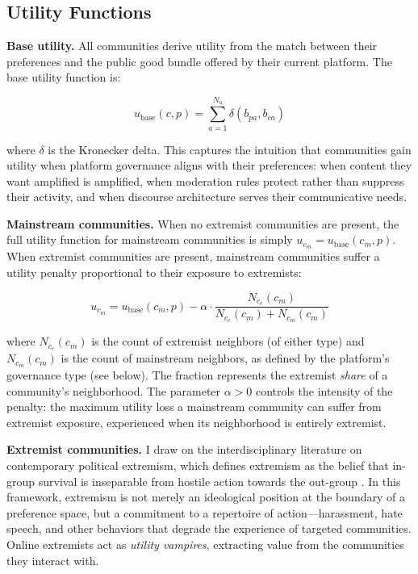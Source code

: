 \documentclass{article}
\begin{document}
\subsection{Utility Functions}
\label{sec:utility}

\textbf{Base utility.} All communities derive utility from the match between their preferences and the public good bundle offered by their current platform. The base utility function is:

\begin{equation}
u_{\text{base}}(c, p) = \sum_{a=1}^{N_a} \delta(b_{pa}, b_{ca})
\label{eq:base}
\end{equation}

\noindent where $\delta$ is the Kronecker delta. This captures the intuition that communities gain utility when platform governance aligns with their preferences: when content they want amplified is amplified, when moderation rules protect rather than suppress their activity, and when discourse architecture serves their communicative needs.

\textbf{Mainstream communities.} When no extremist communities are present, the full utility function for mainstream communities is simply $u_{c_m} = u_{\text{base}}(c_m, p)$. When extremist communities are present, mainstream communities suffer a utility penalty proportional to their exposure to extremists:

\begin{equation}
u_{c_m} = u_{\text{base}}(c_m, p) - \alpha \cdot \frac{N_{c_e}(c_m)}{N_{c_e}(c_m) + N_{c_m}(c_m)}
\label{eq:mainstream_app}
\end{equation}

\noindent where $N_{c_e}(c_m)$ is the count of extremist neighbors (of either type) and $N_{c_m}(c_m)$ is the count of mainstream neighbors, as defined by the platform's governance type (see below). The fraction represents the extremist \textit{share} of a community's neighborhood. The parameter $\alpha > 0$ controls the intensity of the penalty: the maximum utility loss a mainstream community can suffer from extremist exposure, experienced when its neighborhood is entirely extremist.

\textbf{Extremist communities.} I draw on the interdisciplinary literature on contemporary political extremism, which defines extremism as the belief that in-group survival is inseparable from hostile action towards the out-group \citep{berger2018extremism, gaudetteUpvotingExtremismCollective2021}. In this framework, extremism is not merely an ideological position at the boundary of a preference space, but a commitment to a repertoire of action---harassment, hate speech, and other behaviors that degrade the experience of targeted communities. Online extremists act as \textit{utility vampires}, extracting value from the communities they interact with.
\end{document}
